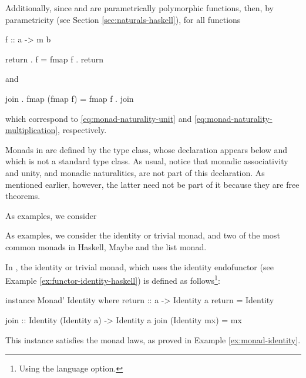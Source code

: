 Additionally, since 
and 
are parametrically polymorphic
functions, then, by parametricity (see Section
\ref{sec:naturals-haskell}), for all functions
\begin{codehaskell}
f :: a -> m b
\end{codehaskell}
\begin{codehaskell}
return . f = fmap f . return
\end{codehaskell}
and
\begin{codehaskell}
join . fmap (fmap f) = fmap f . join
\end{codehaskell}
which correspond to \eqref{eq:monad-naturality-unit} and
\eqref{eq:monad-naturality-multiplication}, respectively.

Monads in \hask are defined by the  type class,
whose declaration appears below and which is not a standard type
class. As usual, notice that monadic associativity and unity, and
monadic naturalities, are not part of this declaration. As mentioned
earlier, however, the latter need not be part of it because they are
free theorems.

As examples, we consider 

As examples, we consider the identity or trivial monad, and two of the
most common monads in Haskell, Maybe and the list monad.


\begin{example}
  \label{ex:monad-identity-haskell}

  In \hask, the identity or trivial monad, which uses the identity
  endofunctor (see Example \ref{ex:functor-identity-haskell}) is
  defined as follows\footnote{Using the 
    language option.}:
  \begin{codehaskell}
instance Monad' Identity where
  return :: a -> Identity a
  return = Identity

  join :: Identity (Identity a) -> Identity a
  join (Identity mx) = mx
  \end{codehaskell}
  This instance satisfies the monad laws, as proved in Example
  \ref{ex:monad-identity}.

\end{example}

